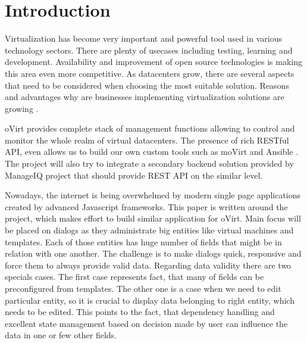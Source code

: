 \renewcommand{\lstlistingname}{Code sample}

\chapter{Introduction}
Virtualization has become very important and powerful tool used in various technology sectors. There are plenty of usecases including testing, learning and development. Availability and improvement of open source technologies is making this area even more competitive. As datacenters grow, there are several aspects that need to be considered when choosing the most suitable solution. Reasons and advantages why are businesses implementing virtualization solutions are growing \cite{virtualization}.

oVirt\cite{oVirt} provides complete stack of management functions allowing to control and monitor the whole realm of virtual datacenters. The presence of rich RESTful API, even allows us to build our own custom tools such as moVirt \cite{moVirt} and Ansible \cite{Ansible}. The project will also try to integrate a secondary backend solution provided by ManageIQ project that should provide REST API on the similar level.

Nowadays, the internet is being overwhelmed by modern single page applications created by advanced Javascript frameworks. This paper is written around the project, which makes effort to build similar application for oVirt. Main focus will be placed on dialogs as they administrate big entities like virtual machines and templates. Each of those entities has huge number of fields that might be in relation with one another. The challenge is to make dialogs quick, responsive and force them to always provide valid data. Regarding data validity there are two specials cases. The first case represents fact, that many of fields can be preconfigured from templates. The other one is a case when we need to edit particular entity, so it is crucial to display data belonging to right entity, which needs to be edited. This points to the fact, that dependency handling and excellent state management based on decision made by user can influence the data in one or few other fields.

